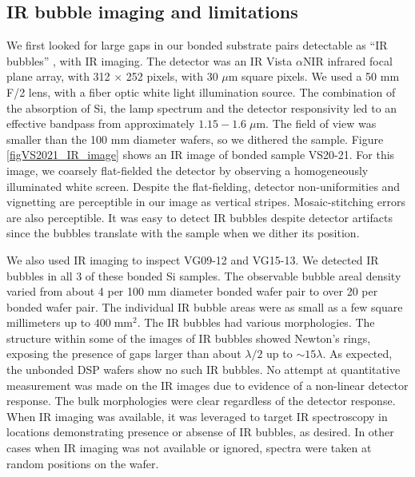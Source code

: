 \documentclass[osajnl,preprint,showpacs,superscriptaddress,12pt]{revtex4-1} %
\begin{document}
\subsection{IR bubble imaging and limitations}

We first looked for large gaps in our bonded substrate pairs detectable as ``IR bubbles'' \cite{1992JEMat..21..669M}, with IR imaging.  The detector was an IR Vista $\alpha$NIR infrared focal plane array, with 312 $\times$ 252 pixels, with 30 $\mu$m square pixels.  We used a 50 mm F/2 lens, with a fiber optic white light illumination source.  The combination of the absorption of Si, the lamp spectrum and the detector responsivity led to an effective bandpass from approximately $1.15-1.6\;\mu$m.  The field of view was smaller than the 100 mm diameter wafers, so we dithered the sample.  Figure \ref{figVS2021_IR_image} shows an IR image of bonded sample VS20-21.  For this image, we coarsely flat-fielded the detector by observing a homogeneously illuminated white screen. Despite the flat-fielding, detector non-uniformities and vignetting are perceptible in our image as vertical stripes.  Mosaic-stitching errors are also perceptible.  It was easy to detect IR bubbles despite detector artifacts since the bubbles translate with the sample when we dither its position.

We also used IR imaging to inspect VG09-12 and VG15-13.  We detected IR bubbles in all 3 of these bonded Si samples.  The observable bubble areal density varied from about 4 per 100 mm diameter bonded wafer pair to over 20 per bonded wafer pair.  The individual IR bubble areas were as small as a few square millimeters up to $400\;\mathrm{mm}^2$.  The IR bubbles had various morphologies.  The structure within some of the images of IR bubbles showed Newton's rings, exposing the presence of gaps larger than about $\lambda/2$ up to $\sim 15 \lambda$.  As expected, the unbonded DSP wafers show no such IR bubbles.  No attempt at quantitative measurement was made on the IR images due to evidence of a non-linear detector response.  The bulk morphologies were clear regardless of the detector response.  When IR imaging was available, it was leveraged to target IR spectroscopy in locations demonstrating presence or absense of IR bubbles, as desired.  In other cases when IR imaging was not available or ignored, spectra were taken at random positions on the wafer.
\end{document}
